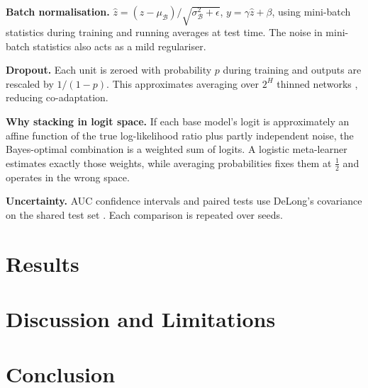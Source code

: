 \documentclass[conference]{IEEEtran}
\begin{document}
\textbf{Batch normalisation.}
$\hat z=(z-\mu_\mathcal B)/\sqrt{\sigma^2_\mathcal B+\epsilon}$, $y=\gamma\hat z+\beta$, using mini-batch
statistics during training and running averages at test time. The noise in mini-batch statistics
also acts as a mild regulariser.

\textbf{Dropout.} Each unit is zeroed with probability $p$ during training and outputs are rescaled
by $1/(1-p)$. This approximates averaging over $2^{H}$ thinned networks \cite{srivastava2014dropout},
reducing co-adaptation.

\textbf{Why stacking in logit space.} If each base model's logit is approximately an affine function
of the true log-likelihood ratio plus partly independent noise, the Bayes-optimal combination is a
weighted sum of logits. A logistic meta-learner estimates exactly those weights, while averaging
probabilities fixes them at $\tfrac12$ and operates in the wrong space.

\textbf{Uncertainty.} AUC confidence intervals and paired tests use DeLong's covariance on the shared
test set \cite{delong1988comparing,sun2014fast}. Each comparison is repeated over seeds.

\section{Results}\label{sec:results}


\section{Discussion and Limitations}\label{sec:discussion}


\section{Conclusion}




\end{document}
